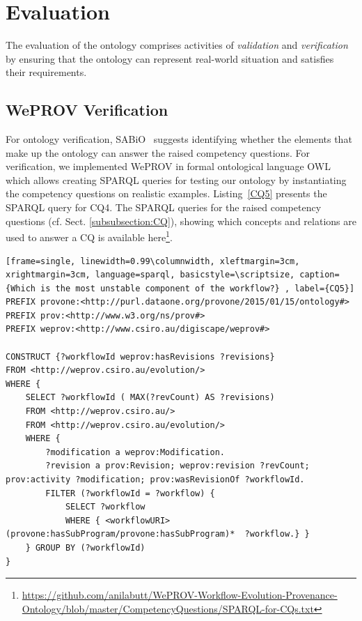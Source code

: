 \documentclass[ao]{iosart2x}
\begin{document}
\section{Evaluation}
\label{sec:evaluation}

The evaluation of the ontology comprises activities of \textit{validation} and \textit{verification} by ensuring that the ontology can represent real-world situation and satisfies their requirements.

\subsection{WePROV Verification}
\label{verification}
For ontology verification, SABiO~\citep{de2014sabio} suggests identifying whether the elements that make up the ontology can answer the raised competency questions. For verification, we implemented WePROV in formal ontological language OWL which allows creating SPARQL queries for testing our ontology by instantiating the competency questions on realistic examples. Listing~\ref{CQ5} presents the SPARQL query for CQ4. 
The SPARQL queries for the raised competency questions (cf. Sect. \ref{subsubsection:CQ}), showing which concepts and relations are used to answer a CQ is available here\footnote{\url{https://github.com/anilabutt/WePROV-Workflow-Evolution-Provenance-Ontology/blob/master/CompetencyQuestions/SPARQL-for-CQs.txt}}. 

\begin{lstlisting}[frame=single, linewidth=0.99\columnwidth, xleftmargin=3cm, xrightmargin=3cm, language=sparql, basicstyle=\scriptsize, caption={Which is the most unstable component of the workflow?} , label={CQ5}]
PREFIX provone:<http://purl.dataone.org/provone/2015/01/15/ontology#> 
PREFIX prov:<http://www.w3.org/ns/prov#> 
PREFIX weprov:<http://www.csiro.au/digiscape/weprov#> 

CONSTRUCT {?workflowId weprov:hasRevisions ?revisions}  
FROM <http://weprov.csiro.au/evolution/> 
WHERE {
	SELECT ?workflowId ( MAX(?revCount) AS ?revisions)  
	FROM <http://weprov.csiro.au/>
	FROM <http://weprov.csiro.au/evolution/> 
	WHERE { 
		?modification a weprov:Modification. 
		?revision a prov:Revision; weprov:revision ?revCount; prov:activity ?modification; prov:wasRevisionOf ?workflowId.  
		FILTER (?workflowId = ?workflow) { 
			SELECT ?workflow 
			WHERE { <workflowURI>  (provone:hasSubProgram/provone:hasSubProgram)*  ?workflow.} } 
	} GROUP BY (?workflowId) 
}
\end{lstlisting}
\end{document}
